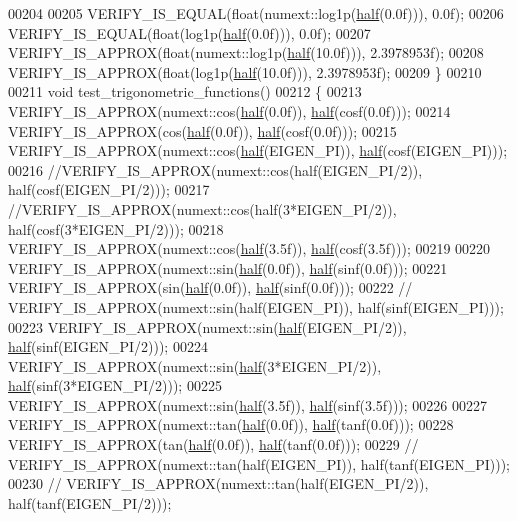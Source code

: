 \begin{DoxyCode}
00204 
00205   VERIFY\_IS\_EQUAL(\textcolor{keywordtype}{float}(numext::log1p(\hyperlink{struct_eigen_1_1half}{half}(0.0f))), 0.0f);
00206   VERIFY\_IS\_EQUAL(\textcolor{keywordtype}{float}(log1p(\hyperlink{struct_eigen_1_1half}{half}(0.0f))), 0.0f);
00207   VERIFY\_IS\_APPROX(\textcolor{keywordtype}{float}(numext::log1p(\hyperlink{struct_eigen_1_1half}{half}(10.0f))), 2.3978953f);
00208   VERIFY\_IS\_APPROX(\textcolor{keywordtype}{float}(log1p(\hyperlink{struct_eigen_1_1half}{half}(10.0f))), 2.3978953f);
00209 \}
00210 
00211 \textcolor{keywordtype}{void} test\_trigonometric\_functions()
00212 \{
00213   VERIFY\_IS\_APPROX(numext::cos(\hyperlink{struct_eigen_1_1half}{half}(0.0f)), \hyperlink{struct_eigen_1_1half}{half}(cosf(0.0f)));
00214   VERIFY\_IS\_APPROX(cos(\hyperlink{struct_eigen_1_1half}{half}(0.0f)), \hyperlink{struct_eigen_1_1half}{half}(cosf(0.0f)));
00215   VERIFY\_IS\_APPROX(numext::cos(\hyperlink{struct_eigen_1_1half}{half}(EIGEN\_PI)), \hyperlink{struct_eigen_1_1half}{half}(cosf(EIGEN\_PI)));
00216   \textcolor{comment}{//VERIFY\_IS\_APPROX(numext::cos(half(EIGEN\_PI/2)), half(cosf(EIGEN\_PI/2)));}
00217   \textcolor{comment}{//VERIFY\_IS\_APPROX(numext::cos(half(3*EIGEN\_PI/2)), half(cosf(3*EIGEN\_PI/2)));}
00218   VERIFY\_IS\_APPROX(numext::cos(\hyperlink{struct_eigen_1_1half}{half}(3.5f)), \hyperlink{struct_eigen_1_1half}{half}(cosf(3.5f)));
00219 
00220   VERIFY\_IS\_APPROX(numext::sin(\hyperlink{struct_eigen_1_1half}{half}(0.0f)), \hyperlink{struct_eigen_1_1half}{half}(sinf(0.0f)));
00221   VERIFY\_IS\_APPROX(sin(\hyperlink{struct_eigen_1_1half}{half}(0.0f)), \hyperlink{struct_eigen_1_1half}{half}(sinf(0.0f)));
00222   \textcolor{comment}{//  VERIFY\_IS\_APPROX(numext::sin(half(EIGEN\_PI)), half(sinf(EIGEN\_PI)));}
00223   VERIFY\_IS\_APPROX(numext::sin(\hyperlink{struct_eigen_1_1half}{half}(EIGEN\_PI/2)), \hyperlink{struct_eigen_1_1half}{half}(sinf(EIGEN\_PI/2)));
00224   VERIFY\_IS\_APPROX(numext::sin(\hyperlink{struct_eigen_1_1half}{half}(3*EIGEN\_PI/2)), \hyperlink{struct_eigen_1_1half}{half}(sinf(3*EIGEN\_PI/2)));
00225   VERIFY\_IS\_APPROX(numext::sin(\hyperlink{struct_eigen_1_1half}{half}(3.5f)), \hyperlink{struct_eigen_1_1half}{half}(sinf(3.5f)));
00226 
00227   VERIFY\_IS\_APPROX(numext::tan(\hyperlink{struct_eigen_1_1half}{half}(0.0f)), \hyperlink{struct_eigen_1_1half}{half}(tanf(0.0f)));
00228   VERIFY\_IS\_APPROX(tan(\hyperlink{struct_eigen_1_1half}{half}(0.0f)), \hyperlink{struct_eigen_1_1half}{half}(tanf(0.0f)));
00229   \textcolor{comment}{//  VERIFY\_IS\_APPROX(numext::tan(half(EIGEN\_PI)), half(tanf(EIGEN\_PI)));}
00230   \textcolor{comment}{//  VERIFY\_IS\_APPROX(numext::tan(half(EIGEN\_PI/2)), half(tanf(EIGEN\_PI/2)));}

\end{DoxyCode}
